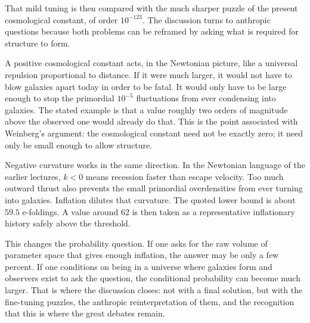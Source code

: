 That mild tuning is then compared with the much sharper puzzle of the present cosmological constant, of order \(10^{-123}\). The discussion turns to anthropic questions because both problems can be reframed by asking what is required for structure to form.

A positive cosmological constant acts, in the Newtonian picture, like a universal repulsion proportional to distance. If it were much larger, it would not have to blow galaxies apart today in order to be fatal. It would only have to be large enough to stop the primordial \(10^{-5}\) fluctuations from ever condensing into galaxies. The stated example is that a value roughly two orders of magnitude above the observed one would already do that. This is the point associated with Weinberg's argument: the cosmological constant need not be exactly zero; it need only be small enough to allow structure.

Negative curvature works in the same direction. In the Newtonian language of the earlier lectures, \(k<0\) means recession faster than escape velocity. Too much outward thrust also prevents the small primordial overdensities from ever turning into galaxies. Inflation dilutes that curvature. The quoted lower bound is about \(59.5\) e-foldings. A value around \(62\) is then taken as a representative inflationary history safely above the threshold.

This changes the probability question. If one asks for the raw volume of parameter space that gives enough inflation, the answer may be only a few percent. If one conditions on being in a universe where galaxies form and observers exist to ask the question, the conditional probability can become much larger. That is where the discussion closes: not with a final solution, but with the fine-tuning puzzles, the anthropic reinterpretation of them, and the recognition that this is where the great debates remain.
